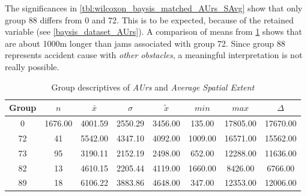 The significances in \cref{tbl:wilcoxon_baysis_matched_AUrs_SAvg} show that only group 88 differs from 0 and 72. This is to be expected, because of the retained variable (see \cref{baysis_dataset_AUrs}). A comparison of means from \cref{tbl:descriptives_baysis_matched_AUrs_SAvg} shows that are about 1000m longer than jams associated with group 72. Since group 88 represents accident cause with \textit{other obstacles}, a meaningful interpretation is not really possible. 
\begin{table}[ht]
	\small
	\centering
	\begin{tabular}{c|c|c|c|c|c|c|c}
		\toprule
		Group & $n$ & $\bar{x}$ & $\sigma$ & $\tilde{x}$ & $min$ & $max$ & $\Delta$ \\ 
		\midrule
		0  & 1676.00 & 4001.59 & 2550.29 & 3456.00 & 135.00 & 17805.00 & 17670.00 \\ 
		72 & 41 & 5542.00 & 4347.10 & 4092.00 & 1009.00 & 16571.00 & 15562.00 \\ 
		73 & 95 & 3190.11 & 2152.19 & 2498.00 & 652.00 & 12288.00 & 11636.00 \\ 
		82 & 13 & 4610.15 & 2205.44 & 4119.00 & 1660.00 & 8426.00 & 6766.00 \\ 
		89 & 18 & 6106.22 & 3883.86 & 4648.00 & 347.00 & 12353.00 & 12006.00 \\ 
		\bottomrule
	\end{tabular}
	\caption{Group descriptives of \textit{AUrs} and \textit{Average Spatial Extent}}
	\label{tbl:descriptives_baysis_matched_AUrs_SAvg}
\end{table}


